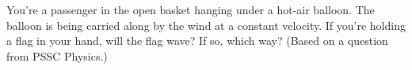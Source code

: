 You're a passenger in the open basket hanging under a hot-air balloon.
The balloon is being carried along by the wind at a constant velocity.
If you're holding a flag in your hand, will the flag wave? If so,
which way? (Based on a question from PSSC Physics.)
